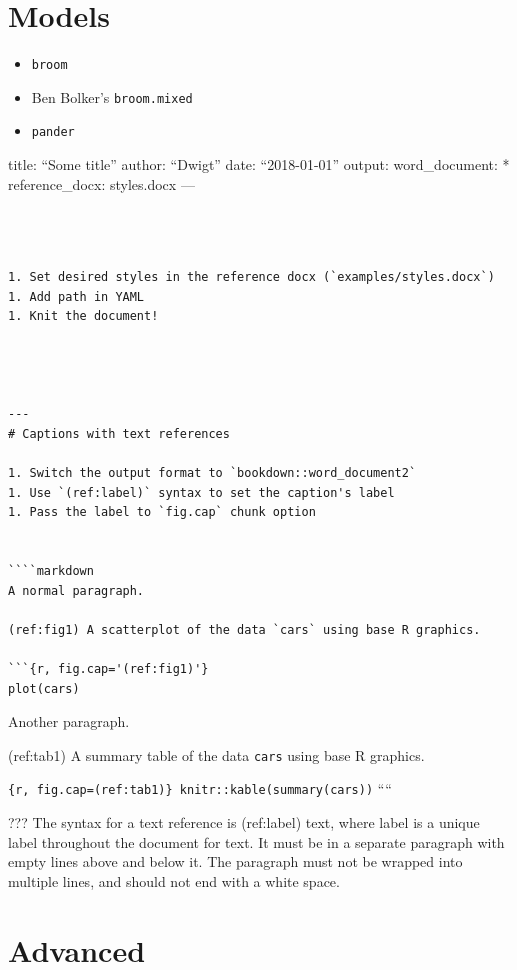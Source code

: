 \documentclass[]{article}
\providecommand{\tightlist}{%
  \setlength{\itemsep}{0pt}\setlength{\parskip}{0pt}}
\begin{document}
\hypertarget{models}{%
\section{Models}\label{models}}

\begin{itemize}
\tightlist
\item
  \texttt{broom}
\item
  Ben Bolker's \texttt{broom.mixed}
\item
  \texttt{pander}
\end{itemize}

title: ``Some title'' author: ``Dwigt'' date: ``2018-01-01'' output:
word\_document: * reference\_docx: styles.docx ---

\begin{verbatim}



1. Set desired styles in the reference docx (`examples/styles.docx`)
1. Add path in YAML
1. Knit the document!




---
# Captions with text references

1. Switch the output format to `bookdown::word_document2`
1. Use `(ref:label)` syntax to set the caption's label
1. Pass the label to `fig.cap` chunk option


````markdown
A normal paragraph.

(ref:fig1) A scatterplot of the data `cars` using base R graphics. 

```{r, fig.cap='(ref:fig1)'}
plot(cars)
\end{verbatim}

Another paragraph.

(ref:tab1) A summary table of the data \texttt{cars} using base R
graphics.

\texttt{\{r,\ fig.cap=\textquotesingle{}(ref:tab1)\textquotesingle{}\}\ knitr::kable(summary(cars))}
````

??? The syntax for a text reference is (ref:label) text, where label is
a unique label throughout the document for text. It must be in a
separate paragraph with empty lines above and below it. The paragraph
must not be wrapped into multiple lines, and should not end with a white
space.

\hypertarget{advanced}{%
\section{Advanced}\label{advanced}}
\end{document}
